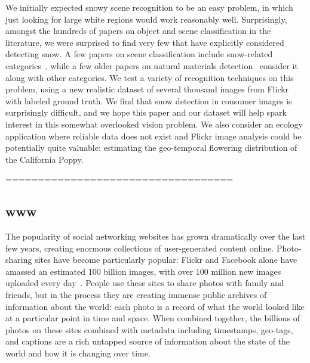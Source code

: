 \documentclass[10pt,journal,compsoc]{IEEEtran}
\begin{document}
We initially expected snowy scene recognition to be an easy problem,
in which just looking for large white regions
would work reasonably well.  Surprisingly, amongst the hundreds of
papers on object and scene classification in the literature, we were
surprised to find very few that have explicitly considered detecting
snow. A few papers on scene classification include
snow-related
categories~\cite{XiaoHEOT10,li2007event,li2009totalscene}, while a few
older papers on natural materials
detection~\cite{luo2003spatialcontext,boutell2006semanticfeature}
consider it along with other categories. We test a variety of
recognition techniques on this problem, using a new realistic dataset
of several thousand  images from Flickr with labeled ground
truth.  We find that snow detection in consumer images is 
surprisingly difficult, and we hope this paper and our dataset
will help spark interest in this somewhat overlooked vision problem.
%
We also consider an ecology application where reliable data does not
exist and Flickr image analysis could be potentially quite valuable: estimating the geo-temporal flowering distribution of the
California Poppy.  




\hfill \break
\hfill \break
===================================
\hfill \break
\hfill \break
\subsection*{www}


The popularity of social networking websites has grown dramatically
over the last few years, creating enormous collections of
user-generated content online. Photo-sharing sites have become
particularly popular: Flickr and Facebook alone have amassed an
estimated 100 billion images, with over 100 million new images
uploaded every day~\cite{Kremerskothen11}.  People use these
sites to share photos with family and friends, but in the process they
are creating immense public archives of information about the world:
each photo is a record of what the world looked like at a particular
point in time and space.  When combined together, the billions of
photos on these sites combined with metadata including timestamps,
geo-tags, and captions are a rich untapped source of information about
the state of the world and how it is changing over
time.
\end{document}
